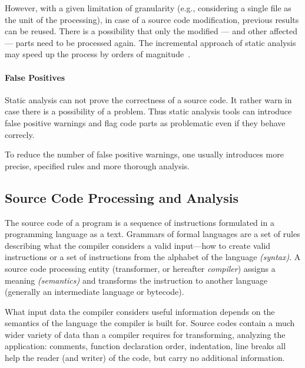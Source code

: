 However, with a given limitation of granularity (e.g., considering a single file as the unit of the processing), in case of a source code modification, previous results can be reused. There is a possibility that only the modified --- and other affected --- parts need to be processed again. The incremental approach of static analysis may speed up the process by orders of magnitude~\cite{stein-daniel-bsc}.

\paragraph{False Positives} Static analysis can not prove the correctness of a source code. It rather warn in case there is a possibility of a problem. Thus static analysis tools can introduce false positive warnings and flag code parts as problematic even if they behave correcly.

To reduce the number of false positive warnings, one usually introduces more precise, specified rules and more thorough analysis.

%
%

\subsection{Source Code Processing and Analysis}
\label{sect:source-code-processing}
The source code of a program is a sequence of instructions formulated in a programming language as a text. Grammars of formal languages are a set of rules describing what the compiler considers a valid input---how to create valid instructions or a set of instructions from the alphabet of the language \emph{(syntax)}. A source code processing entity (transformer, or hereafter \emph{compiler}) assigns a meaning \emph{(semantics)} and transforms the instruction to another language (generally an intermediate language or bytecode).

What input data the compiler considers useful information depends on the semantics of the language the compiler is built for. Source codes contain a much wider variety of data than a compiler requires for transforming, analyzing the application: comments, function declaration order, indentation, line breaks all help the reader (and writer) of the code, but carry no additional information.

